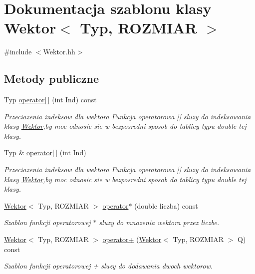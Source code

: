\hypertarget{class_wektor}{
\section{Dokumentacja szablonu klasy Wektor$<$ Typ, ROZMIAR $>$}
\label{class_wektor}
}


{\ttfamily \#include $<$Wektor.hh$>$}

\subsection*{Metody publiczne}
\begin{DoxyCompactItemize}
\item 
Typ \hyperlink{class_wektor_a0da276143fa53c457a7d1c836fe0fee6}{operator\mbox{[}$\,$\mbox{]}} (int Ind) const 
\begin{DoxyCompactList}\small\item\em Przeciazenia indeksow dla wektora Funkcja operatorowa \mbox{[}\mbox{]} sluzy do indeksowania klasy \hyperlink{class_wektor}{Wektor},by moc odnosic sie w bezposredni sposob do tablicy typu double tej klasy. \item\end{DoxyCompactList}\item 
Typ \& \hyperlink{class_wektor_ab1cf35ef42f4d254639df879b86560b5}{operator\mbox{[}$\,$\mbox{]}} (int Ind)
\begin{DoxyCompactList}\small\item\em Przeciazenia indeksow dla wektora Funkcja operatorowa \mbox{[}\mbox{]} sluzy do indeksowania klasy \hyperlink{class_wektor}{Wektor},by moc odnosic sie w bezposredni sposob do tablicy typu double tej klasy. \item\end{DoxyCompactList}\item 
\hyperlink{class_wektor}{Wektor}$<$ Typ, ROZMIAR $>$ \hyperlink{class_wektor_a69adce9a9015aa4ccca6320ca93a7a41}{operator$\ast$} (double liczba) const 
\begin{DoxyCompactList}\small\item\em Szablon funkcji operatorowej $\ast$ sluzy do mnozenia wektora przez liczbe. \item\end{DoxyCompactList}\item 
\hyperlink{class_wektor}{Wektor}$<$ Typ, ROZMIAR $>$ \hyperlink{class_wektor_a3dac94ec81b3bdbcd64565c3ae75230f}{operator+} (\hyperlink{class_wektor}{Wektor}$<$ Typ, ROZMIAR $>$ Q) const 
\begin{DoxyCompactList}\small\item\em Szablon funkcji operatorowej + sluzy do dodawania dwoch wektorow. \item\end{DoxyCompactList}\item 

\end{DoxyCompactItemize}
